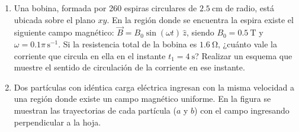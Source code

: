 \documentclass[a4paper,11pt,dvipsnames, twocolumn]{article}
\def\M{9} %
\def\P{2} %
\begin{document}
\begin{strip}
\begin{tcolorbox}[colback=white]
\begin{tcbraster}[raster columns=\M, raster equal height,colback=white,before skip=0pt, boxsep=0.5pt]
\begin{tcolorbox}[raster multicolumn=\P, colback=white,left=2pt,right=2pt]
    \bigskip
    \bigskip
  \end{tcolorbox}
\end{tcbraster}

\end{tcolorbox}
\end{strip}

\begin{enumerate}[wide, labelwidth=!, labelindent=0pt]

\item Una bobina, formada por 260 espiras circulares de $\SI{2.5}{\centi\metre}$ de radio, está ubicada sobre el plano $xy$. En la región donde se encuentra la espira existe el siguiente campo magnético: $\vec{B} = B_0\sin(\omega t)\,\hat{z}$, siendo $B_0=\SI{0.5}{\tesla}$ y $\omega=0.1\pi\,\text{s}^{-1}$. Si la resistencia total de la bobina es $\SI{1.6}{\ohm}$, ¿cuánto vale la corriente que circula en ella en el instante $t_1=\SI{4}{\second}$? Realizar un esquema que muestre el sentido de circulación de la corriente en ese instante.

\item Dos partículas con idéntica carga eléctrica ingresan con la misma velocidad a una región donde existe un campo magnético uniforme. En la figura se muestran las trayectorias de cada partícula ($a$ y $b$) con el campo ingresando perpendicular a la hoja.
\begin{center}
\end{center}


\end{enumerate}
\end{document}
